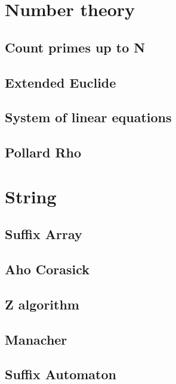 \section{Number theory}
\subsection{Count primes up to N}
\raggedbottom
\hrulefill
\subsection{Extended Euclide}
\raggedbottom
\hrulefill
\subsection{System of linear equations}
\raggedbottom
\hrulefill
\subsection{Pollard Rho}
\raggedbottom
\hrulefill

\section{String}
\subsection{Suffix Array}
\raggedbottom
\hrulefill
\subsection{Aho Corasick}
\raggedbottom
\hrulefill
\subsection{Z algorithm}
\raggedbottom
\hrulefill
\subsection{Manacher}
\raggedbottom
\hrulefill
\subsection{Suffix Automaton}
\raggedbottom
\hrulefill


